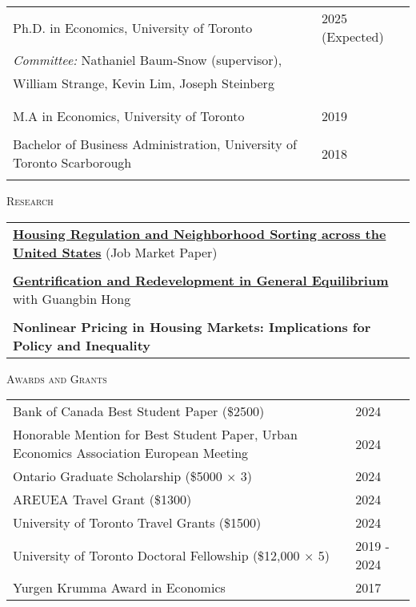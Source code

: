 \documentclass[11pt]{amsart}
\begin{document}
\normalsize
\begin{tabular}{ p{12.5cm}  p{5cm}}
  \large{Ph.D. in Economics, University of Toronto}  & 2025 (Expected) \\
   \multicolumn{2}{l}{ \hspace{.75cm}  \emph{Committee:}  Nathaniel Baum-Snow (supervisor), } \\
     \hspace{2.8cm}  William Strange, Kevin Lim, Joseph Steinberg  \\
 \hspace{2.90cm}   \\
  \\
  \large{M.A in Economics, University of Toronto}    & 2019            \\
   \\
  \large{Bachelor of Business Administration, University of Toronto Scarborough}   & 2018            \\
                                                     &                 
\end{tabular}

\vspace{0.4cm}




\LARGE
\textsc{Research}
\vspace{0.2cm}
\normalsize

\begin{tabular}{ p{15.5cm}}
 \href{https://jamesmacek.github.io/research/lswus}{\textbf{Housing Regulation and Neighborhood Sorting across the United States}} (Job Market Paper)                         \\

\\
 \href{https://jamesmacek.github.io/research/gent}{\textbf{Gentrification and Redevelopment in General Equilibrium}} with Guangbin Hong \\
\\
\textbf{Nonlinear Pricing in Housing Markets: Implications for Policy and Inequality} 
\normalsize
\end{tabular}

\vspace{0.4cm}

\LARGE
\textsc{Awards and Grants}
\vspace{0.2cm}


\normalsize 
\begin{tabular}{ p{12.5cm}  p{5cm}}
  Bank of Canada Best Student Paper (\$2500) & 2024 \\
  Honorable Mention for Best Student Paper, Urban Economics Association European Meeting & 2024\\
  Ontario Graduate Scholarship (\$5000 $\times$ 3) & 2024 \\
  AREUEA Travel Grant (\$1300)    & 2024         \\
  University of Toronto Travel Grants (\$1500) & 2024 \\
  University of Toronto Doctoral Fellowship  (\$12,000 $ \times$ 5)  & 2019 - 2024  \\
  Yurgen Krumma Award in Economics & 2017
\end{tabular}
\end{document}
